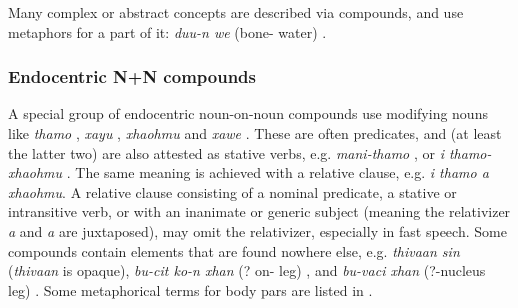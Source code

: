 
Many complex or abstract concepts are described via compounds, and use metaphors for a part of it: \textit{duu-n we} (bone- water) .

\subsubsection{Endocentric N+N compounds}

A special group of endocentric noun-on-noun compounds use modifying nouns like \textit{thamo} , \textit{xayu} , \textit{xhaohmu}  and \textit{xawe} . These are often predicates, and (at least the latter two) are also attested as stative verbs, e.g. \textit{mani-thamo} , or \textit{i thamo-xhaohmu} . The same meaning is achieved with a relative clause, e.g. \textit{i thamo a xhaohmu}. A relative clause consisting of a nominal predicate, a stative or intransitive verb, or with an inanimate or generic subject (meaning the relativizer \textit{a} and \textit{a}  are juxtaposed), may omit the relativizer, especially in fast speech. 
Some compounds contain elements that are found nowhere else, e.g. \textit{thivaan sin}  (\textit{thivaan} is opaque), \textit{bu-cit ko-n xhan} (? on- leg) , and \textit{bu-vaci xhan} (?-nucleus leg) . Some metaphorical terms for body pars are listed in .


